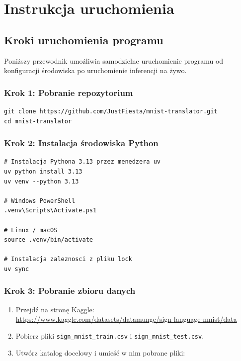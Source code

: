 \chapter{Instrukcja uruchomienia}
\label{cha:chapter005}

\section{Kroki uruchomienia programu}

Poniższy przewodnik umożliwia samodzielne uruchomienie programu od
konfiguracji środowiska po uruchomienie inferencji na żywo.

\subsection*{Krok 1: Pobranie repozytorium}

\begin{lstlisting}[style=styleBash, numbers=none, caption={Klonowanie repozytorium}, label=lst:clone]
git clone https://github.com/JustFiesta/mnist-translator.git
cd mnist-translator
\end{lstlisting}

\subsection*{Krok 2: Instalacja środowiska Python}

\begin{lstlisting}[style=styleBash, numbers=none, caption={Konfiguracja środowiska wirtualnego}, label=lst:venv]
# Instalacja Pythona 3.13 przez menedzera uv
uv python install 3.13
uv venv --python 3.13

# Windows PowerShell
.venv\Scripts\Activate.ps1

# Linux / macOS
source .venv/bin/activate

# Instalacja zaleznosci z pliku lock
uv sync
\end{lstlisting}

\subsection*{Krok 3: Pobranie zbioru danych}

\begin{enumerate}
    \item Przejdź na stronę Kaggle:\\
          \url{https://www.kaggle.com/datasets/datamunge/sign-language-mnist/data}
    \item Pobierz pliki \texttt{sign\_mnist\_train.csv} i \texttt{sign\_mnist\_test.csv}.
    \item Utwórz katalog docelowy i umieść w nim pobrane pliki:
\end{enumerate}

